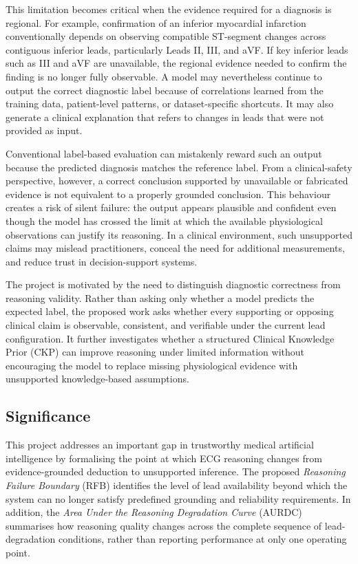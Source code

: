 \documentclass{ssnreview}
\begin{document}
This limitation becomes critical when the evidence required for a diagnosis is regional.
For example, confirmation of an inferior myocardial infarction conventionally depends on
observing compatible ST-segment changes across contiguous inferior leads, particularly
Leads II, III, and aVF. If key inferior leads such as III and aVF are unavailable, the
regional evidence needed to confirm the finding is no longer fully observable. A model may
nevertheless continue to output the correct diagnostic label because of correlations learned
from the training data, patient-level patterns, or dataset-specific shortcuts. It may also
generate a clinical explanation that refers to changes in leads that were not provided as
input.

Conventional label-based evaluation can mistakenly reward such an output because the
predicted diagnosis matches the reference label. From a clinical-safety perspective,
however, a correct conclusion supported by unavailable or fabricated evidence is not
equivalent to a properly grounded conclusion. This behaviour creates a risk of silent
failure: the output appears plausible and confident even though the model has crossed the
limit at which the available physiological observations can justify its reasoning. In a
clinical environment, such unsupported claims may mislead practitioners, conceal the need
for additional measurements, and reduce trust in decision-support systems.

The project is motivated by the need to distinguish diagnostic correctness from reasoning
validity. Rather than asking only whether a model predicts the expected label, the proposed
work asks whether every supporting or opposing clinical claim is observable, consistent,
and verifiable under the current lead configuration. It further investigates whether a
structured Clinical Knowledge Prior (CKP) can improve reasoning under limited information
without encouraging the model to replace missing physiological evidence with unsupported
knowledge-based assumptions.

\subsection*{Significance}

This project addresses an important gap in trustworthy medical artificial intelligence by
formalising the point at which ECG reasoning changes from evidence-grounded deduction to
unsupported inference. The proposed \emph{Reasoning Failure Boundary} (RFB) identifies
the level of lead availability beyond which the system can no longer satisfy predefined
grounding and reliability requirements. In addition, the \emph{Area Under the Reasoning
Degradation Curve} (AURDC) summarises how reasoning quality changes across the complete
sequence of lead-degradation conditions, rather than reporting performance at only one
operating point.
\end{document}
